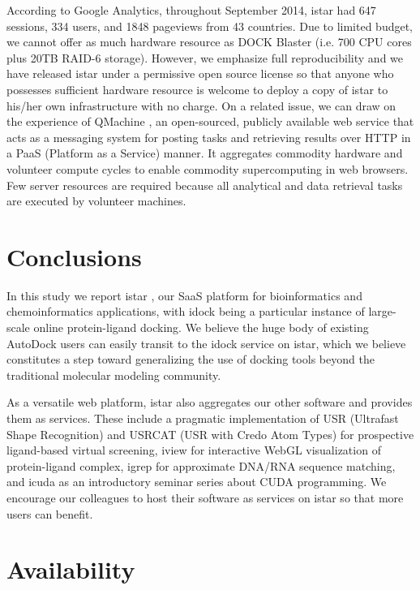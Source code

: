 According to Google Analytics, throughout September 2014, istar had 647 sessions, 334 users, and 1848 pageviews from 43 countries. Due to limited budget, we cannot offer as much hardware resource as DOCK Blaster (i.e. 700 CPU cores plus 20TB RAID-6 storage). However, we emphasize full reproducibility \citep{965} and we have released istar under a permissive open source license so that anyone who possesses sufficient hardware resource is welcome to deploy a copy of istar to his/her own infrastructure with no charge. On a related issue, we can draw on the experience of QMachine \citep{1405}, an open-sourced, publicly available web service that acts as a messaging system for posting tasks and retrieving results over HTTP in a PaaS (Platform as a Service) manner. It aggregates commodity hardware and volunteer compute cycles to enable commodity supercomputing in web browsers. Few server resources are required because all analytical and data retrieval tasks are executed by volunteer machines.

\section{Conclusions}

In this study we report istar \citep{1362}, our SaaS platform for bioinformatics and chemoinformatics applications, with idock \citep{1153} being a particular instance of large-scale online protein-ligand docking. We believe the huge body of existing AutoDock users can easily transit to the idock service on istar, which we believe constitutes a step toward generalizing the use of docking tools beyond the traditional molecular modeling community.

As a versatile web platform, istar also aggregates our other software and provides them as services. These include a pragmatic implementation of USR (Ultrafast Shape Recognition) \citep{1379} and USRCAT (USR with Credo Atom Types) \citep{1331} for prospective ligand-based virtual screening, iview \citep{1366} for interactive WebGL visualization of protein-ligand complex, igrep \citep{1138} for approximate DNA/RNA sequence matching, and icuda as an introductory seminar series about CUDA programming. We encourage our colleagues to host their software as services on istar so that more users can benefit.

\section{Availability}

